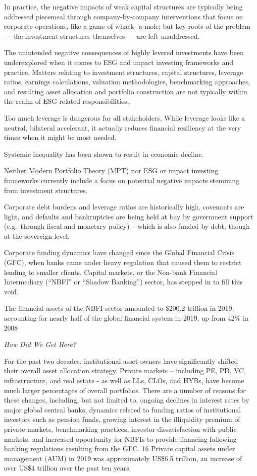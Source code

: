 \documentclass[
]{book}
\begin{document}
In practice, the negative impacts of weak capital structures are typically being addressed piecemeal
through company-by-company interventions that focus on corporate operations, like a game of whack-
a-mole; but key roots of the problem --- the investment structures themselves --- are left unaddressed.

The unintended negative consequences of highly levered investments have been underexplored when it
comes to ESG and impact investing frameworks and practice. Matters relating to investment structures,
capital structures, leverage ratios, earnings calculations, valuation methodologies, benchmarking
approaches, and resulting asset allocation and portfolio construction are not typically within the realm
of ESG-related responsibilities.

Too much leverage is dangerous for all stakeholders.
While leverage looks like a neutral, bilateral accelerant, it
actually reduces financial resiliency at the very times when it might be most needed.

Systemic inequality has been shown to result in economic decline.

Neither Modern Portfolio Theory (MPT) nor ESG or impact investing frameworks
currently include a focus on potential negative impacts stemming from
investment structures.

Corporate debt burdens and leverage ratios are historically high, covenants are light, and
defaults and bankruptcies are being held at bay by government support
(e.g.~through fiscal and monetary policy) -- which is also funded by debt,
though at the sovereign level.

Corporate funding dynamics have changed since the Global Financial Crisis
(GFC), when banks came under heavy regulation that caused them to
restrict lending to smaller clients.
Capital markets, or the Non-bank Financial Intermediary
(``NBFI'' or ``Shadow Banking'') sector, has stepped in to fill this void.

The financial assets of the NBFI sector amounted to \$200.2 trillion in 2019,
accounting for nearly half of the global financial system in 2019, up from 42\%
in 2008

\emph{How Did We Get Here?}

For the past two decades, institutional asset owners have significantly shifted their overall asset
allocation strategy. Private markets -- including PE, PD, VC, infrastructure, and real estate - as well as LLs,
CLOs, and HYBs, have become much larger percentages of overall portfolios. There are a number of
reasons for these changes, including, but not limited to, ongoing declines in interest rates by major
global central banks, dynamics related to funding ratios of institutional investors such as pension funds,
growing interest in the illiquidity premium of private markets, benchmarking practices, investor
dissatisfaction with public markets, and increased opportunity for NBFIs to provide financing following
banking regulations resulting from the GFC. 16 Private capital assets under management (AUM) in 2019
was approximately US\$6.5 trillion, an increase of over US\$4 trillion over the past ten years.
\end{document}
